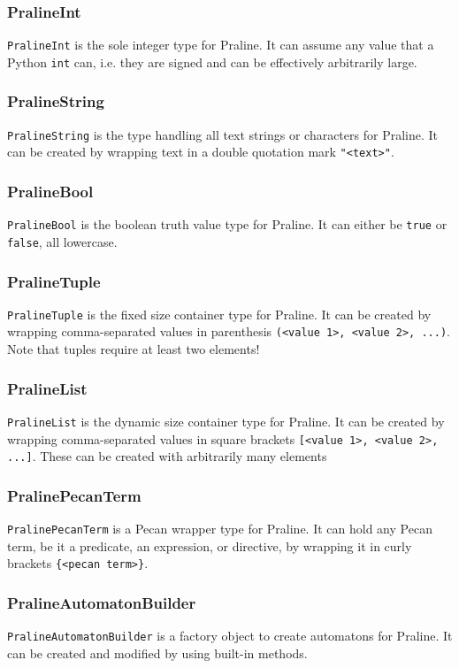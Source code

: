 \documentclass{report}
\begin{document}
\subsubsection{PralineInt}
\verb+PralineInt+ is the sole integer type for Praline.
It can assume any value that a Python \verb+int+ can, i.e. they are signed and can be effectively arbitrarily large.

\subsubsection{PralineString}
\verb+PralineString+ is the type handling all text strings or characters for Praline.
It can be created by wrapping text in a double quotation mark \verb+"<text>"+.

\subsubsection{PralineBool}
\verb+PralineBool+ is the boolean truth value type for Praline.
It can either be \verb+true+ or \verb+false+, all lowercase.

\subsubsection{PralineTuple}
\verb+PralineTuple+ is the fixed size container type for Praline.
It can be created by wrapping comma-separated values in parenthesis \verb+(<value 1>, <value 2>, ...)+.
Note that tuples require at least two elements!

\subsubsection{PralineList}
\verb+PralineList+ is the dynamic size container type for Praline.
It can be created by wrapping comma-separated values in square brackets \verb+[<value 1>, <value 2>, ...]+.
These can be created with arbitrarily many elements

\subsubsection{PralinePecanTerm}
\verb+PralinePecanTerm+ is a Pecan wrapper type for Praline.
It can hold any Pecan term, be it a predicate, an expression, or directive, by wrapping it in curly brackets \verb+{<pecan term>}+.

\subsubsection{PralineAutomatonBuilder}
\verb+PralineAutomatonBuilder+ is a factory object to create automatons for Praline.
It can be created and modified by using built-in methods.
\end{document}
